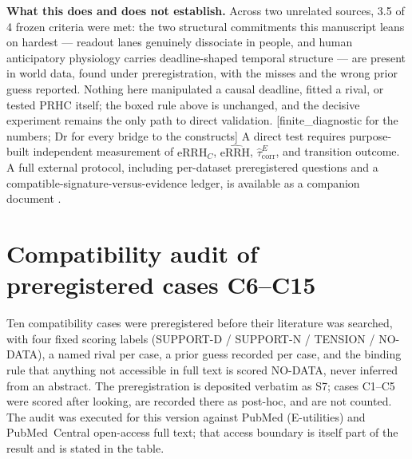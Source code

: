 \documentclass[9pt,twocolumn]{article}
\newcommand{\eRRHc}{\mathrm{eRRH}_{C}}
\newcommand{\eRRHhat}{\widehat{\mathrm{eRRH}}}
\newcommand{\tcorr}{\widehat{\tau}^{E}_{\mathrm{corr}}}
\newcommand{\tier}[1]{{\sffamily\scriptsize\color{RRHMSlate}[#1]}}
\begin{document}
\textbf{What this does and does not establish.} Across two unrelated sources, 3.5 of 4 frozen criteria were met: the two structural commitments this manuscript leans on hardest --- readout lanes genuinely dissociate in people, and human anticipatory physiology carries deadline-shaped temporal structure --- are present in world data, found under preregistration, with the misses and the wrong prior guess reported. Nothing here manipulated a causal deadline, fitted a rival, or tested PRHC itself; the boxed rule above is unchanged, and the decisive experiment remains the only path to direct validation. \tier{finite\_diagnostic for the numbers; Dr for every bridge to the constructs}
A direct test requires purpose-built independent measurement of $\eRRHc$, $\eRRHhat$, $\tcorr$, and transition outcome. A full external protocol, including per-dataset preregistered questions and a compatible-signature-versus-evidence ledger, is available as a companion document \cite{lahtee2026extprotocol}.

\section{Compatibility audit of preregistered cases C6--C15}
\label{sec:audit}
Ten compatibility cases were preregistered before their literature was searched, with four fixed scoring labels (SUPPORT-D / SUPPORT-N / TENSION / NO-DATA), a named rival per case, a prior guess recorded per case, and the binding rule that anything not accessible in full text is scored NO-DATA, never inferred from an abstract. The preregistration is deposited verbatim as S7; cases C1--C5 were scored after looking, are recorded there as post-hoc, and are not counted. The audit was executed for this version against PubMed (E-utilities) and PubMed~Central open-access full text; that access boundary is itself part of the result and is stated in the table.
\end{document}

